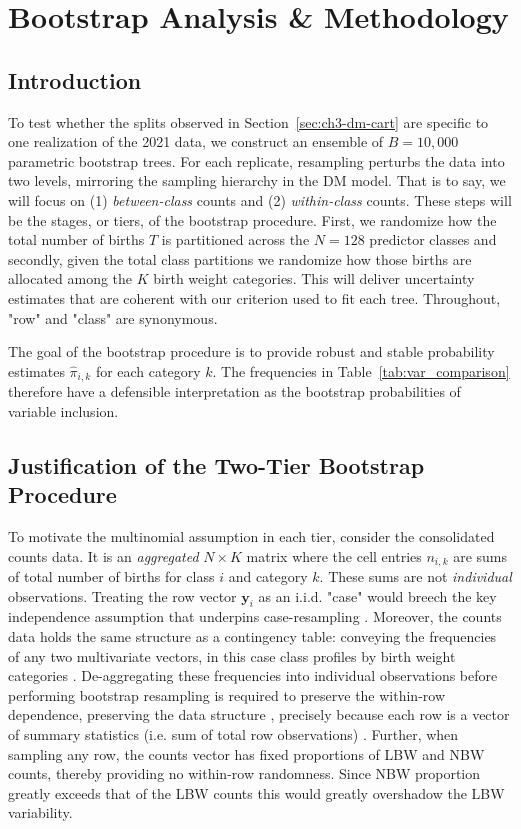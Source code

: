 \newpage 

\section{Bootstrap Analysis \& Methodology}
\label{sec:ch3:boot}

\subsection{Introduction}
\label{sec:ch3-boot-intro}
To test whether the splits observed in Section~\ref{sec:ch3-dm-cart} are specific to one realization of the 2021 data, we construct an ensemble of \(B =10,000\) parametric bootstrap trees. For each replicate, resampling perturbs the data into two levels, mirroring the sampling hierarchy in the DM model. That is to say, we will focus on (1) \emph{between-class} counts and (2) \emph{within-class} counts. These steps will be the stages, or tiers, of the bootstrap procedure. First, we randomize how the total number of births \(T\) is partitioned across the \(N=128\) predictor classes and secondly, given the total class partitions we randomize how those births are allocated among the \(K\) birth weight categories. This will deliver uncertainty estimates that are coherent with our criterion used to fit each tree. Throughout, "row" and "class" are synonymous. 

The goal of the bootstrap procedure is to provide robust and stable probability estimates \(\hat{\pi}_{i,k}\) for each category \(k\). The frequencies in Table~\ref{tab:var_comparison} therefore have a defensible interpretation as the bootstrap probabilities of variable inclusion.

\subsection{Justification of the Two-Tier Bootstrap Procedure}
\label{sec:ch3-justifiaction}
To motivate the multinomial assumption in each tier, consider the consolidated counts data. It is an \emph{aggregated} \(N \times K\) matrix where the cell entries \(n_{i,k}\) are sums of total number of births for class \(i\) and category \(k\). These sums are not \emph{individual} observations. Treating the row vector \(\mathbf{y}_i\) as an i.i.d. "case" would breech the key independence assumption that underpins case-resampling \parencite[slide 47]{case_resampling} \parencite{math10244671}. Moreover, the counts data holds the same structure as a contingency table: conveying the frequencies of any two multivariate vectors, in this case class profiles by birth weight categories \parencite{wiki:contingency}. De-aggregating these frequencies into individual observations before performing bootstrap resampling is required to preserve the within-row dependence, preserving the data structure \parencite{stackexchangeBootstrapResampling}, precisely because each row is a vector of summary statistics (i.e. sum of total row observations) \parencite{wiki:summary_statistic}. Further, when sampling any row, the counts vector has fixed proportions of LBW and NBW counts, thereby providing no within-row randomness. Since NBW proportion greatly exceeds that of the LBW counts this would greatly overshadow the LBW variability.

